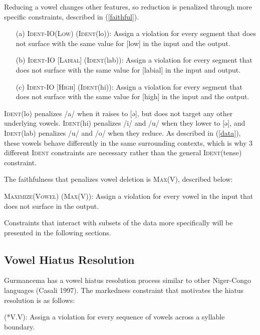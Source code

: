 \documentclass[output=paper,
modfonts
]{langscibook}
\begin{document}
Reducing a vowel changes other features, so reduction is penalized through more specific constraints, described in 
(\ref{faithful}).


\ea \label{faithful}
\begin{enumerate}

\item[(a)]
\textsc{Ident-IO(Low)} (\textsc{Ident}(lo)): Assign a violation for every segment that does not surface with the same value for [low] in the input and the output.

\item[(b)]\textsc{Ident-IO [Labial]} (\textsc{Ident}(lab)): Assign a violation for every segment that 	does not surface with the same value for [labial] in the input and output.

\item[(c)] \textsc{Ident-IO [High]} (\textsc{Ident}(hi)):  Assign a violation for every segment that does 	not surface with the same value for [high] in the input and the output. 
 
 \end{enumerate}
\z 

 \textsc{Ident}(lo) penalizes /a/ when it raises to [ə], but does not target any other underlying vowels. \textsc{Ident}(hi) penalizes /i/ and /u/ when they lower to [ə], and \textsc{Ident}(lab) penalizes /u/ and /o/ when they reduce. As described in (\ref{data}), these vowels behave differently in the same surrounding contexts, which is why 3 different \textsc{Ident} constraints are necessary rather than the general \textsc{Ident}(tense) constraint. 
 
The faithfulness that penalizes vowel deletion is \textsc{Max}(V), described below:
  
\ea
\textsc{Maximize(Vowel)} (\textsc{Max(V)}): Assign a violation for every vowel in the input 	that does not surface in the output. 
\z

Constraints that interact with subsets of the data more specifically will be 
presented in the following sections. 

\subsection{Vowel Hiatus Resolution}

Gurmancema has a vowel hiatus resolution process similar to other Niger-Congo languages (Casali 1997). 
The markedness constraint that motivates the hiatus resolution is as follows:

\ea
 (*V.V): Assign a violation for every sequence of vowels across a syllable 	boundary. 
\z
  
\end{document}
